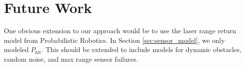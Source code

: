 \section{Future Work}

One obvious extension to our approach would be to use the laser range return model from Probabilistic Robotics.
In Section \ref{sec:sensor_model}, we only modeled $P_\text{hit}$.
This should be extended to include models for dynamic obstacles, random noise, and max range sensor failures.